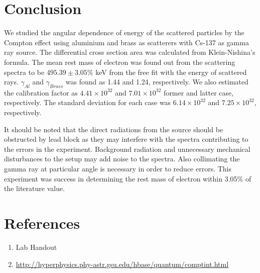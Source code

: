 \documentclass[a4paper, amsfonts, amssymb, amsmath, reprint, showkeys, nofootinbib, twoside]{revtex4-1}
\begin{document}
\section{Conclusion}
We studied the angular dependence of energy of the scattered particles by the Compton effect using aluminium and brass as scatterers with Cs-137 as gamma ray source. The differential cross section area was calculated from Klein-Nishina's formula. The mean rest mass of electron was found out from the scattering spectra to be $495.39\pm3.05\%$ keV from the free fit with the energy of scattered rays. $\gamma_{Al}$ and $\gamma_{Brass}$ was found as 1.44 and 1.24, respectively. We also estimated the calibration factor as $4.41\times10^{32}$ and $7.01\times10^{32}$ former and latter case, respectively. The standard deviation for each case was $6.14\times10^{32}$ and $ 7.25\times10^{32}$, respectively. 

It should be noted that the direct radiations from the source should be obstructed by lead block as they may interfere with the spectra contributing to the errors in the experiment. Background radiation and unnecessary mechanical disturbances to the setup may add noise to the spectra. Also collimating the gamma ray at particular angle is necessary in order to reduce errors. This experiment was success in determining the rest mass of electron within 3.05\% of the literature value. 

\section{References}
\begin{enumerate}
\item{{Lab Handout}}
\item{\url{http://hyperphysics.phy-astr.gsu.edu/hbase/quantum/comptint.html}}
\end{enumerate}
\end{document}
